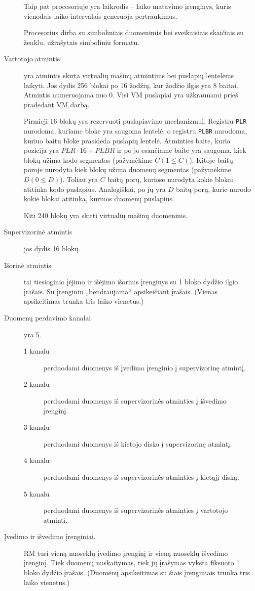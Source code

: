 \begin{description}
    Taip pat procesoriuje yra laikrodis – laiko matavimo įrenginys, kuris
    vienodais laiko intervalais generuoja pertraukimus. 

    Procesorius dirba su simboliniais duomenimis bei sveikaisiais 
    skaičiais su ženklu, užrašytais simboliniu formatu.
  \item[Vartotojo atmintis] yra atmintis skirta virtualių mašinų atmintims 
    bei puslapių lentelėms laikyti. Jos dydis 256 blokai po 16 žodžių, kur
    žodžio ilgis yra 8 baitai. Atmintis numeruojama nuo 0. Visi VM 
    puslapiai yra užkraunami prieš pradedant VM darbą.

    Pirmieji 16 blokų yra rezervuoti puslapiavimo mechanizmui. Registru
    \verb|PLR| nurodoma, kuriame bloke yra saugoma lentelė, o registru
    \verb|PLBR| nurodoma, kuriuo baitu bloke prasideda puslapių lentelė.
    Atminties baite, kurio pozicija yra $PLR \cdot 16 + PLBR$ ir po jo 
    esančiame baite yra saugoma, kiek blokų užima kodo segmentas 
    (pažymėkime $C (1 \leq C)$). Kitoje baitų poroje nurodyta kiek blokų 
    užima duomenų segmentas (pažymėkime $D (0 \leq D)$). Toliau yra 
    $C$ baitų porų, kuriose nurodyta kokie blokai atitinka kodo puslapius.
    Analogiškai, po jų yra $D$ baitų porų, kurie nurodo kokie blokai 
    atitinka, kuriuos duomenų puslapius.

    Kiti 240 blokų yra skirti virtualių mašinų duomenims.
  \item[Supervizorinė atmintis] jos dydis 16 blokų.
  \item[Išorinė atmintis] tai tiesioginio įėjimo ir išėjimo išorinis
    įrenginys su 1 bloko dydžio ilgio įrašais. Su įrenginiu „bendraujama“
    apsikeičiant įrašais. (Vienas apsikeitimas trunka tris laiko vienetus.)
  \item[Duomenų perdavimo kanalai] yra 5. 
    \begin{description}
      \item[1 kanalu] perduodami duomenys iš įvedimo įrenginio į 
        supervizorinę atmintį.
      \item[2 kanalu] perduodami duomenys iš supervizorinės atminties
        į išvedimo įrenginį.
      \item[3 kanalu] perduodami duomenys iš kietojo disko į supervizorinę
        atmintį.
      \item[4 kanalu] perduodami duomenys iš supervizorinės atminties į 
        kietąjį diską.
      \item[5 kanalu] perduodami duomenys iš supervizorinės atminties į 
        vartotojo atmintį.
    \end{description}
  \item[Įvedimo ir išvedimo įrenginiai.] RM turi vieną nuoseklų įvedimo
    įrenginį ir vieną nuoseklų išvedimo įrenginį. Tiek duomenų nuskaitymas,
    tiek jų įrašymas vyksta fiksuoto 1 bloko dydžio įrašais. (Duomenų
    apsikeitimas su šiais įrenginiais trunka tris laiko vienetus.)
\end{description}
